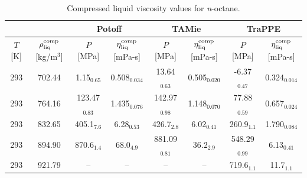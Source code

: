 \documentclass[preprint,review,11pt]{elsarticle}
\begin{document}
	\begin{table}[H]
		\caption{Compressed liquid viscosity values for \textit{n}-octane.}
		\begin{center}
			\begin{tabular}{|c|c|c|c|c|c|c|c|}
				\hline
				&                  & \multicolumn{2}{c|}{Potoff}     & \multicolumn{2}{c|}{TAMie}      & \multicolumn{2}{c|}{TraPPE}    \\ \hline
				$T$ {[}K{]} & $\rho^{\rm comp}_{\rm liq}$ {[}kg/m$^3${]} & $P$ {[}MPa{]}    & $\eta^{\rm comp}_{\rm liq}$ {[}mPa-s{]} & $P$ {[}MPa{]}    & $\eta^{\rm comp}_{\rm liq}$ {[}mPa-s{]} & $P$ {[}MPa{]}   & $\eta^{\rm comp}_{\rm liq}$ {[}mPa-s{]} \\ \hline
				293 & 702.44 & 1.15$_{0.65}$   & 0.508$_{0.034}$ & 13.64$_{0.63}$  & 0.505$_{0.020}$ & -6.37$_{0.47}$  & 0.324$_{0.014}$ \\ \hline
				293 & 764.16 & 123.47$_{0.83}$ & 1.435$_{0.076}$ & 142.97$_{0.98}$ & 1.148$_{0.070}$ & 77.88$_{0.59}$  & 0.657$_{0.024}$ \\ \hline
				293 & 832.65 & 405.1$_{7.6}$   & 6.28$_{0.53}$   & 426.7$_{2.8}$   & 6.02$_{0.41}$   & 260.9$_{1.1}$   & 1.790$_{0.084}$ \\ \hline
				293 & 894.90 & 870.6$_{1.4}$   & 68.0$_{4.9}$    & 881.09$_{0.81}$ & 36.2$_{2.9}$    & 548.29$_{0.99}$ & 6.13$_{0.41}$   \\ \hline
				293 & 921.79 & --               & --               & --               & --               & 719.6$_{1.1}$   & 11.7$_{1.1}$    \\ \hline
			\end{tabular}
		\end{center}
	\end{table}
\end{document}
